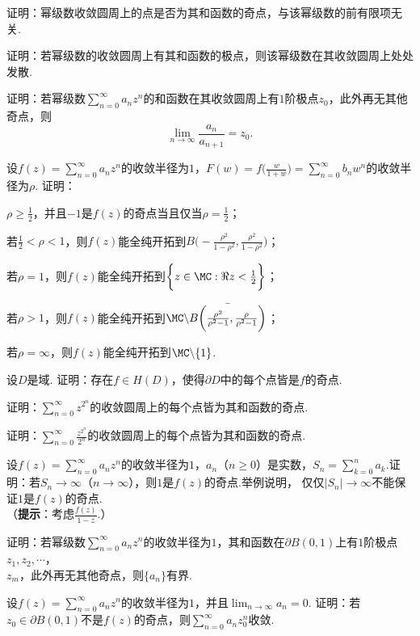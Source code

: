 \begin{xiti}
\item 证明：幂级数收敛圆周上的点是否为其和函数的奇点，与该幂级数的前有限项无关.
\item 证明：若幂级数的收敛圆周上有其和函数的极点，则该幂级数在其收敛圆周上处处发散.
\item 证明：若幂级数$\sum_{n=0}^\infty a_nz^n$的和函数在其收敛圆周上有$1$阶极点$z_0$，此外再无其他奇点，则
    \[\lim_{n\to\infty}\frac{a_n}{a_{n+1}}=z_0.\]
\item 设$f(z)=\sum_{n=0}^\infty a_nz^n$的收敛半径为$1$，$F(w)=f\bigg(\frac w{1+w}\bigg)=\sum_{n=0}^\infty b_nw^n$的收敛半径为$\rho$. 证明：
\begin{enuma}
  \item $\rho\ge\frac12$，并且$-1$是$f(z)$的奇点当且仅当$\rho=\frac12$；
  \item 若$\frac12<\rho<1$，则$f(z)$能全纯开拓到$B\bigg(-\frac{\rho^2}{1-\rho^2},\frac{\rho^2}{1-\rho^2}\bigg)$；
  \item 若$\rho=1$，则$f(z)$能全纯开拓到$\bigg\{z\in\MC:\Re z<\frac12\bigg\}$；
  \item 若$\rho>1$，则$f(z)$能全纯开拓到$\MC\backslash\bar{B\bigg(\frac{\rho^2} {\rho^2-1},\frac{\rho}{\rho^2-1}\bigg)}$；
  \item 若$\rho=\infty$，则$f(z)$能全纯开拓到$\MC\backslash\{1\}$.
\end{enuma}
\item 设$D$是域. 证明：存在$f\in H(D)$，使得$\partial D$中的每个点皆是$f$的奇点.
\item 证明：$\sum_{n=0}^\infty z^{2^n}$的收敛圆周上的每个点皆为其和函数的奇点.
\item 证明：$\sum_{n=0}^\infty \frac{z^{2^n}}{2^n}$的收敛圆周上的每个点皆为其和函数的奇点.
\item 设$f(z)=\sum_{n=0}^\infty a_nz^n$的收敛半径为$1$，$a_n$（$n\ge0$）是实数，$S_n=\sum_{k=0}^na_k $.证明：若$S_n\to\infty$（$n\to\infty$），则$1$是$f(z)$的奇点.举例说明，
    仅仅$|S_n|\to\infty$不能保证$1$是$f(z)$的奇点.\\
（\textbf{提示}：考虑$\frac{f(z)}{1-z}$.）
\item 证明：若幂级数$\sum_{n=0}^\infty a_nz^n$的收敛半径为$1$，其和函数在$\partial B(0,1)$上有$1$阶极点$z_1,z_2,\cdots$，\\$z_m$，此外再无其他奇点，则$\{a_n\}$有界.
\item 设$f(z)=\sum_{n=0}^\infty a_nz^n$的收敛半径为$1$，并且$\lim_{n\to\infty}a_n=0$. 证明：若$z_0\in\partial B(0,1)$不是$f(z)$的奇点，则$\sum_{n=0}^\infty a_nz_0^n$收敛.
\end{xiti}

